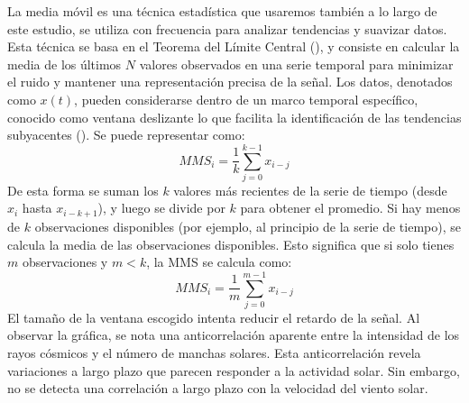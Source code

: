 La media móvil es una técnica estadística que usaremos también a lo largo de este estudio, se utiliza con frecuencia para analizar tendencias y suavizar datos. Esta técnica se basa en el Teorema del Límite Central (\cite{Davies_2023}), y consiste en calcular la media de los últimos $N$ valores observados en una serie temporal para minimizar el ruido y mantener una representación precisa de la señal. Los datos, denotados como $x(t)$, pueden considerarse dentro de un marco temporal específico, conocido como ventana deslizante lo que facilita la identificación de las tendencias subyacentes (\cite{wang_2019}). Se puede representar como:
$$
MMS_i = \frac{1}{k} \sum_{j=0}^{k-1} x_{i-j}
$$
De esta forma se suman los $k$ valores más recientes de la serie de tiempo (desde $x_i$ hasta $x_{i-k+1}$), y luego se divide por $k$ para obtener el promedio. Si hay menos de $k$ observaciones disponibles (por ejemplo, al principio de la serie de tiempo), se calcula la media de las observaciones disponibles. Esto significa que si solo tienes $m$ observaciones y $m < k$, la MMS se calcula como:
$$
MMS_i = \frac{1}{m} \sum_{j=0}^{m-1} x_{i-j}
$$
El tamaño de la ventana escogido intenta reducir el retardo de la señal. Al observar la gráfica, se nota una anticorrelación aparente entre la intensidad de los rayos cósmicos y el número de manchas solares. Esta anticorrelación revela variaciones a largo plazo que parecen responder a la actividad solar. Sin embargo, no se detecta una correlación a largo plazo con la velocidad del viento solar.
